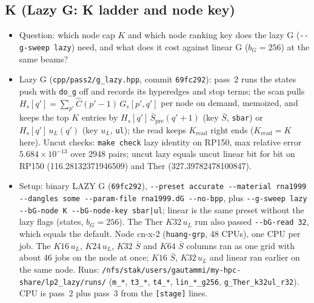 \documentclass[11pt]{article}
\begin{document}
\subsection{K (Lazy G: K ladder and node key)}
\begin{itemize}[leftmargin=*]
  \item Question: which node cap $K$ and which node ranking key does the lazy G (\texttt{-{}-g-sweep lazy}) need, and what does it cost against linear G ($b_G=256$) at the same beams?
  \item Lazy G (\texttt{cpp/pass2/g\_lazy.hpp}, commit \texttt{69fc292}): pass~2 runs the states push with \texttt{do\_g} off and records its hyperedges and stop terms; the scan pulls $H_s[q'] = \sum_{p'} \hat C(p'-1)\,G_s[p',q']$ per node on demand, memoized, and keeps the top $K$ entries by $H_s[q']\,\bar S_{\mathrm{pre}}(q'+1)$ (key $\bar S$, \texttt{sbar}) or $H_s[q']\,u_L(q')$ (key $u_L$, \texttt{ul}); the read keeps $K_{\mathrm{read}}$ right ends ($K_{\mathrm{read}}=K$ here). Uncut checks: \texttt{make check} lazy identity on RP150, max relative error $5.684\times10^{-13}$ over 2948 pairs; uncut lazy equals uncut linear bit for bit on RP150 (116.28132371946509) and Ther (327.39782478100847).
  \item Setup: binary LAZY G (\texttt{69fc292}), \texttt{-{}-preset accurate -{}-material rna1999 -{}-dangles some -{}-param-file rna1999.dG -{}-no-bpp}, plus \texttt{-{}-g-sweep lazy -{}-bG-node K -{}-bG-node-key sbar|ul}; linear is the same preset without the lazy flags (states, $b_G=256$). The Ther $K32\,u_L$ run also passed \texttt{-{}-bG-read 32}, which equals the default. Node cn-x-2 (\texttt{huang-grp}, 48 CPUs), one CPU per job. The $K16\,u_L$, $K24\,u_L$, $K32$ $\bar S$ and $K64$ $\bar S$ columns ran as one grid with about 46 jobs on the node at once; $K16$ $\bar S$, $K32\,u_L$ and linear ran earlier on the same node. Runs: \texttt{/nfs/stak/users/gautammi/my-hpc-share/lp2\_lazy/runs/} (\texttt{m\_*}, \texttt{t3\_*}, \texttt{t4\_*}, \texttt{lin\_*\_g256}, \texttt{g\_Ther\_k32ul\_r32}). CPU is pass~2 plus pass~3 from the \texttt{[stage]} lines.
\end{itemize}
\end{document}

